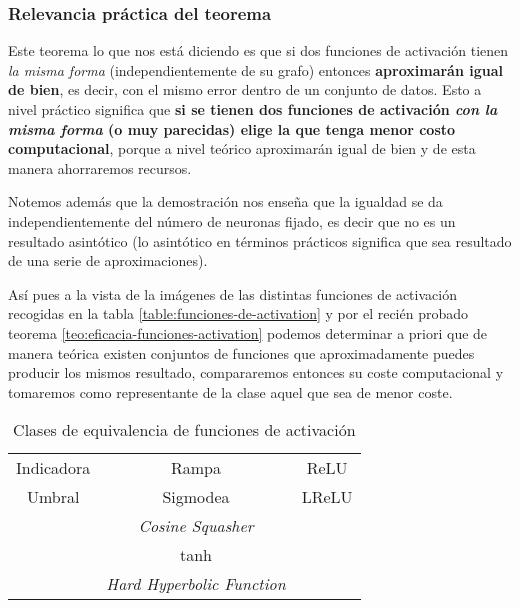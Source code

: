 \subsubsection*{Relevancia práctica del teorema}
Este teorema lo que nos está diciendo es que si dos funciones de activación tienen \textit{la misma forma}
(independientemente de su grafo)
entonces \textbf{aproximarán igual de bien},
es decir, con el mismo error dentro de un conjunto de datos.
 Esto a nivel práctico  significa que \textbf{si se tienen dos funciones de activación
  \textit{con la misma forma} (o muy parecidas) elige
   la que tenga menor costo computacional}, porque a 
   nivel teórico aproximarán igual de bien y de esta
    manera ahorraremos recursos. 

Notemos además que la demostración nos enseña que la igualdad se da independientemente del número de 
neuronas fijado, es decir que no es un resultado 
asintótico (lo asintótico en términos prácticos 
significa que sea resultado de una serie de 
aproximaciones).  


Así pues a la vista de la imágenes de las distintas funciones de activación 
recogidas en la tabla \ref{table:funciones-de-activation} y
por el recién probado teorema \ref{teo:eficacia-funciones-activation} podemos determinar a priori que de manera teórica existen conjuntos de funciones que aproximadamente  puedes producir los mismos resultado, 
compararemos entonces su coste computacional y tomaremos como representante de la clase aquel que sea de menor coste. 

\begin{table}[H] 
    \centering  
    \begin{tabular}{| c | c | c | }
        \hline
        Indicadora &  Rampa & ReLU \\
        Umbral & Sigmodea & LReLU\\
        & \textit{Cosine Squasher}& \\
        & tanh& \\
        & \textit{Hard Hyperbolic Function}& \\
\hline
    \end{tabular}
    \caption{Clases de equivalencia de funciones de activación}  
    \label{table:Clases-equivalencia-activation-function}
\end{table}


